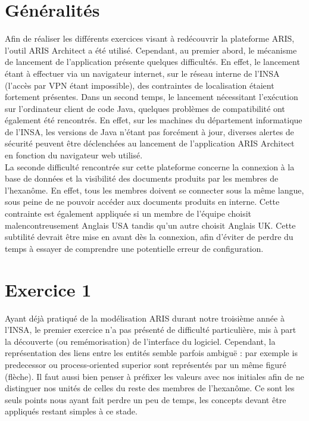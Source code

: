 
\section{Généralités}

Afin de réaliser les différents exercices visant à redécouvrir la plateforme ARIS, l'outil ARIS Architect a été utilisé. Cependant, au premier abord, le mécanisme de lancement de l'application présente quelques difficultés. En effet, le lancement étant à effectuer via un navigateur internet, sur le réseau interne de l'INSA (l'accès par VPN étant impossible), des contraintes de localisation étaient fortement présentes. Dans un second temps, le lancement nécessitant l'exécution sur l'ordinateur client de code Java, quelques problèmes de compatibilité ont également été rencontrés. En effet, sur les machines du département informatique de l'INSA, les versions de Java n'étant pas forcément à jour, diverses alertes de sécurité peuvent être déclenchées au lancement de l'application ARIS Architect en fonction du navigateur web utilisé. \\

La seconde difficulté rencontrée sur cette plateforme concerne la connexion à la base de données et la visibilité des documents produits par les membres de l'hexanôme. En effet, tous les membres doivent se connecter sous la même langue, sous peine de ne pouvoir accéder aux documents produits en interne. Cette contrainte est également appliquée si un membre de l'équipe choisit malencontreusement \og{}Anglais USA\fg{} tandis qu'un autre choisit \og{}Anglais UK\fg{}. Cette subtilité devrait être mise en avant dès la connexion, afin d'éviter de perdre du temps à essayer de comprendre une potentielle erreur de configuration.

\section{Exercice 1}

Ayant déjà pratiqué de la modélisation ARIS durant notre troisième année à l'INSA, le premier exercice n'a pas présenté de difficulté particulière, mis à part la découverte (ou remémorisation) de l'interface du logiciel. Cependant, la représentation des liens entre les entités semble parfois ambiguë : par exemple \og{}is predecessor\fg{} ou \og{}process-oriented superior\fg{} sont représentés par un même figuré (flèche). Il faut aussi bien penser à préfixer les valeurs avec nos initiales afin de ne distinguer nos unités de celles du reste des membres de l'hexanôme. Ce sont les seuls points nous ayant fait perdre un peu de temps, les concepts devant être appliqués restant simples à ce stade.

